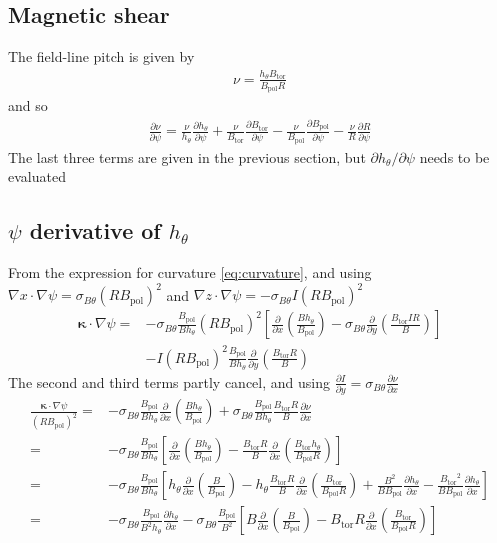 \documentclass[12pt]{article}
\def\L{\left}
\def\R{\right}
\newcommand{\sbt}{\ensuremath{\sigma_{B\theta}}}
\newcommand{\deriv}[2]{\ensuremath{\frac{\partial #1}{\partial #2}}}
\newcommand{\hthe}{\ensuremath{h_\theta}}
\newcommand{\Bp}{\ensuremath{B_{\text{pol}}}}
\newcommand{\Bt}{\ensuremath{B_{\text{tor}}}}
\newcommand{\ve}[1]{\ensuremath{\boldsymbol{#1}}}
\newcommand{\kvec}{\ve{\kappa}}
\newcommand{\rbp}{\ensuremath{R\Bp}}
\newcommand{\rbpsq}{\ensuremath{\L(\rbp\R)^2}}
\begin{document}
\subsection{Magnetic shear}
%
The field-line pitch is given by
%
\begin{align*}
\nu = \frac{\hthe\Bt}{\Bp R}
\end{align*}
%
and so
%
\begin{align*}
\deriv{\nu}{\psi} = \frac{\nu}{\hthe}\deriv{\hthe}{\psi} +
\frac{\nu}{\Bt}\deriv{\Bt}{\psi} - \frac{\nu}{\Bp}\deriv{\Bp}{\psi} -
\frac{\nu}{R}\deriv{R}{\psi}
\end{align*}
%
The last three terms are given in the previous section, but
$\partial\hthe/\partial\psi$ needs to be evaluated



\subsection{\texorpdfstring{$\psi$}{psi}
%
 derivative of \texorpdfstring{$\hthe$}{h}} From the expression for curvature
 \ref{eq:curvature}, and using $\nabla x \cdot \nabla \psi = \sbt
 \L(R\Bp\R)^2$ and $\nabla z\cdot\nabla \psi = -\sbt I
 \L(R\Bp\R)^2$
%
\begin{align*}
\kvec\cdot\nabla\psi =& -\sbt
    \frac{\Bp}{B\hthe}\rbpsq\L[\deriv{}{x}\L(\frac{B\hthe}{\Bp}\R) -
    \sbt\deriv{}{y}\L(\frac{\Bt IR}{B}\R)\R] \\ &- I\rbpsq
        \frac{\Bp}{B\hthe}\deriv{}{y}\L(\frac{\Bt R}{B}\R)
\end{align*}
%
The second and third terms partly cancel, and using $\deriv{I}{y} = \sbt
\deriv{\nu}{x}$
%
\begin{align*}
  \frac{\kvec\cdot\nabla\psi}{\rbpsq} =&
    -\sbt\frac{\Bp}{B\hthe}\deriv{}{x}\L(\frac{B\hthe}{\Bp}\R) +
    \sbt\frac{\Bp}{B\hthe}\frac{\Bt R}{B}\deriv{\nu}{x} \\ =&
    -\sbt\frac{\Bp}{B\hthe}\L[\deriv{}{x}\L(\frac{B\hthe}{\Bp}\R) -
    \frac{\Bt R}{B}\deriv{}{x}\L(\frac{\Bt\hthe}{\Bp R}\R)\R] \\ =&
        -\sbt\frac{\Bp}{B\hthe}\L[\hthe\deriv{}{x}\L(\frac{B}{\Bp}\R)
            - \hthe\frac{\Bt R}{B}\deriv{}{x}\L(\frac{\Bt}{\Bp R}\R) +
        \frac{B^2}{B\Bp}\deriv{\hthe}{x} -
    \frac{\Bt^2}{B\Bp}\deriv{\hthe}{x}\R] \\ =& -\sbt
        \frac{\Bp}{B^2\hthe}\deriv{\hthe}{x} -
        \sbt\frac{\Bp}{B^2}\L[B\deriv{}{x}\L(\frac{B}{\Bp}\R) - \Bt
        R\deriv{}{x}\L(\frac{\Bt}{\Bp R}\R)\R]
\end{align*}
\end{document}
